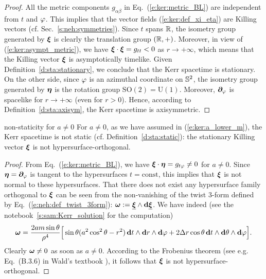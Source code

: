 \begin{proof}
All the metric components $g_{\alpha\beta}$ in Eq.~(\ref{e:ker:metric_BL})
are independent from $t$ and $\varphi$. This implies that the vector fields (\ref{e:ker:def_xi_eta}) are Killing vectors (cf. Sec.~\ref{s:neh:symmetries}).
Since $t$ spans $\mathbb{R}$, the isometry group generated by $\bm{\xi}$ is clearly
the translation group $(\mathbb{R},+)$. Moreover, in
view of (\ref{e:ker:asympt_metric}), we have $\bm{\xi}\cdot\bm{\xi} = g_{tt} < 0$
as $r\rightarrow +\infty$, which means that the Killing vector $\bm{\xi}$
is asymptotically timelike. Given Definition~\ref{d:sta:stationary}, we conclude that the Kerr spacetime is stationary.
On the other side, since $\varphi$ is an azimuthal coordinate
on $\mathbb{S}^2$, the isometry group generated by $\bm{\eta}$ is the rotation
group $\mathrm{SO}(2) = \mathrm{U}(1)$.
Moreover, $\bm{\partial}_\varphi$ is spacelike for $r\to +\infty$ (even for $r>0$).
Hence, according to Definition~\ref{d:sta:axisym}, the Kerr spacetime is axisymmetric.
\end{proof}

\begin{tprop}{non-staticity for $a\neq 0$}{}
For $a\neq 0$, as we have assumed in (\ref{e:ker:a_lower_m}), the
Kerr spacetime is not static (cf. Definition~\ref{d:sta:static}):
the stationary Killing vector $\bm{\xi}$ is not hypersurface-orthogonal.
\end{tprop}

\begin{proof}
From Eq.~(\ref{e:ker:metric_BL}), we have
$\bm{\xi}\cdot\bm{\eta} = g_{t\varphi} \neq 0$ for $a\neq 0$.
Since $\bm{\eta}=\bm{\partial}_\varphi$ is tangent to the hypersurfaces $t=\mathrm{const}$, this implies
that $\bm{\xi}$ is not normal to these hypersurfaces.
That there does not exist any hypersurface
family orthogonal to $\bm{\xi}$ can be seen from the non-vanishing of the twist 3-form defined by Eq.~(\ref{e:neh:def_twist_3form}):
$\bm{\omega} := \underline{\bm{\xi}}\wedge \mathbf{d}\underline{\bm{\xi}}$. We have indeed (see the notebook~\ref{s:sam:Kerr_solution} for the computation)
\[
    \bm{\omega} = \frac{2 a m \sin\theta}{\rho^4} \Big[
        \sin\theta (a^2\cos^2\theta - r^2) \, \mathbf{d} t \wedge \mathbf{d} r \wedge \mathbf{d} \varphi
        + 2 \Delta r \cos\theta \, \mathbf{d} t \wedge \mathbf{d} \theta \wedge \mathbf{d} \varphi \Big] .
\]
Clearly $\bm{\omega} \neq 0$ as soon as $a\neq 0$. According to the
Frobenius theorem (see e.g.
Eq.~(B.3.6) in Wald's textbook \cite{Wald84}), it follows that
$\bm{\xi}$ is not hypersurface-orthogonal.
\end{proof}

